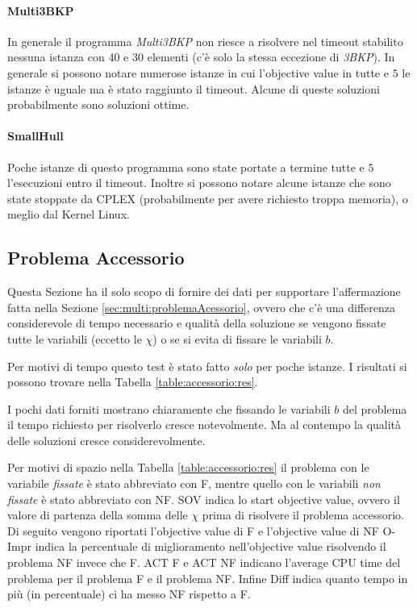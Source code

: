 \paragraph{Multi3BKP}
In generale il programma \emph{Multi3BKP} non riesce a risolvere nel timeout
stabilito nessuna istanza con $40$ e $30$ elementi (c'è solo la stessa eccezione
di \emph{3BKP}). 
In generale si possono notare numerose istanze in cui l'objective value in tutte
e $5$ le istanze è uguale ma è stato raggiunto il timeout. Alcune di queste
soluzioni probabilmente sono soluzioni ottime.


\paragraph{SmallHull}
Poche istanze di questo programma sono state portate a termine tutte e $5$
l'esecuzioni entro il timeout. Inoltre si possono notare alcune istanze che
sono state stoppate da CPLEX (probabilmente per avere richiesto troppa memoria),
o meglio dal Kernel Linux.












\subsection{Problema Accessorio}
\label{sec:benchmark:accessorio}
Questa Sezione ha il solo scopo di fornire dei dati per supportare l'affermazione
fatta nella Sezione \ref{sec:multi:problemaAcessorio}, ovvero che c'è una 
differenza  considerevole di tempo necessario e qualità della soluzione se 
vengono fissate 
tutte le variabili (eccetto le $\chi$) o se si evita di fissare le variabili
$b$.

Per motivi di tempo questo test è stato fatto \emph{solo} per poche istanze.
I risultati si possono trovare nella Tabella \ref{table:accessorio:res}.

I pochi dati forniti mostrano chiaramente che fissando le variabili $b$ del problema
il tempo richiesto per risolverlo cresce notevolmente. Ma al contempo la qualità
delle soluzioni cresce considerevolmente.

Per motivi di spazio nella Tabella \ref{table:accessorio:res} il problema con
le variabile \emph{fissate} è stato abbreviato con F, mentre quello con le
variabili \emph{non fissate} è stato abbreviato con NF.
SOV indica lo start objective
value, ovvero il valore di partenza della somma delle $\chi$ prima di risolvere
il problema accessorio.
Di seguito vengono riportati l'objective value di F e l'objective value di NF 
O-Impr indica la percentuale di miglioramento nell'objective value risolvendo
il problema NF invece che F. 
ACT F e ACT NF indicano l'average CPU time del problema per il problema F
e il problema NF. Infine Diff indica quanto tempo
in più (in percentuale) ci ha messo NF rispetto a F.


